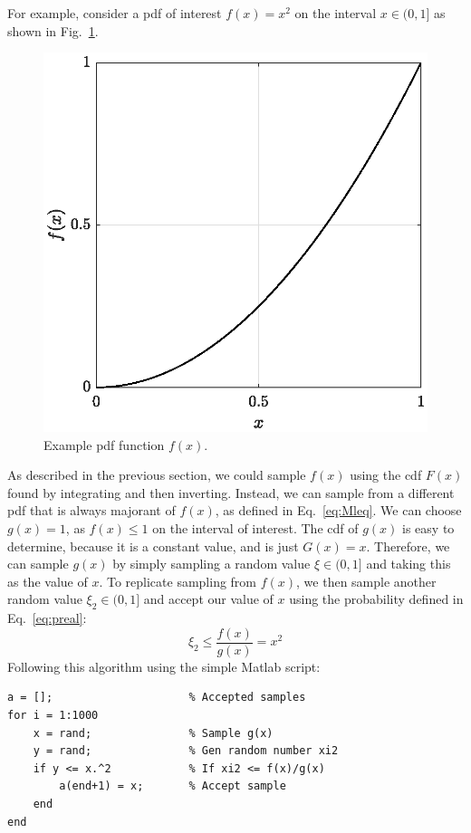 For example, consider a
\gls{pdf} of interest $f(x) = x^2$ on the interval $x \in (0,1]$ as shown
in Fig.~\ref{fig:circle_square}.
\begin{figure}[hbt]
  \centering
  \includegraphics[scale=0.75]{images/circle}
  \caption{Example \gls{pdf} function $f(x)$.}
  \label{fig:circle_square}
\end{figure}
As described in the previous section, we could sample $f(x)$ using the
\gls{cdf} $F(x)$ found by integrating and then inverting. Instead, we can sample from a
different \gls{pdf} that is always majorant of $f(x)$, as defined in
Eq.~\eqref{eq:Mleq}. We can choose $g(x) = 1$, as $f(x) \leq 1$ on
the interval of interest. The \gls{cdf} of $g(x)$ is easy to
determine, because it is a constant value, and is just $G(x) =
x$. Therefore, we can sample $g(x)$ by simply sampling a random value $\xi
\in (0,1]$ and taking this as the value of $x$. To replicate sampling
from $f(x)$, we then sample another random value $\xi_2 \in (0,1]$ and
accept our value of $x$ using the probability defined in Eq.~\eqref{eq:preal}:
\begin{equation*}
  \xi_2 \leq \frac{f(x)}{g(x)} = x^2
\end{equation*}
Following this algorithm using the simple Matlab script:
\begin{lstlisting}
a = [];                     % Accepted samples
for i = 1:1000
    x = rand;               % Sample g(x)
    y = rand;               % Gen random number xi2
    if y <= x.^2            % If xi2 <= f(x)/g(x)
        a(end+1) = x;       % Accept sample
    end
end
\end{lstlisting}
